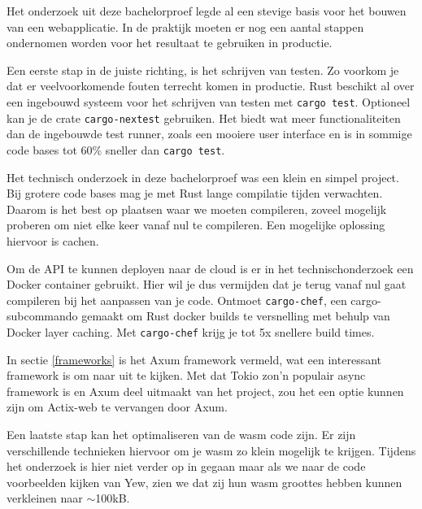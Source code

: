 Het onderzoek uit deze bachelorproef legde al een stevige basis voor het bouwen van een
webapplicatie. In de praktijk moeten er nog een aantal stappen ondernomen worden voor het resultaat
te gebruiken in productie.

Een eerste stap in de juiste richting, is het schrijven van testen. Zo voorkom je dat er
veelvoorkomende fouten terrecht komen in productie. Rust beschikt al over een ingebouwd systeem voor
het schrijven van testen met \texttt{cargo test}. Optioneel kan je de crate
\texttt{cargo-nextest} gebruiken. Het biedt wat meer functionaliteiten dan de ingebouwde
test runner, zoals een mooiere user interface en is in sommige code bases tot 60\% sneller dan
\texttt{cargo test}.

Het technisch onderzoek in deze bachelorproef was een klein en simpel project. Bij grotere code
bases mag je met Rust lange compilatie tijden verwachten. Daarom is het best op plaatsen waar we
moeten compileren, zoveel mogelijk proberen om niet elke keer vanaf nul te compileren. Een mogelijke
oplossing hiervoor is cachen.

Om de API te kunnen deployen naar de cloud is er in het technischonderzoek een Docker container
gebruikt. Hier wil je dus vermijden dat je terug vanaf nul gaat compileren bij het aanpassen van je
code. Ontmoet \texttt{cargo-chef}, een cargo-subcommando gemaakt om Rust docker builds te
versnelling met behulp van Docker layer caching. Met \texttt{cargo-chef} krijg je tot 5x
snellere build times.

In sectie \ref{frameworks} is het Axum framework vermeld, wat een interessant framework is om naar
uit te kijken. Met dat Tokio zon'n populair async framework is en Axum deel uitmaakt van het
project, zou het een optie kunnen zijn om Actix-web te vervangen door Axum. 

Een laatste stap kan het optimaliseren van de wasm code zijn. Er zijn verschillende technieken
hiervoor om je wasm zo klein mogelijk te krijgen. Tijdens het onderzoek is hier niet verder op in
gegaan maar als we naar de code voorbeelden kijken van Yew, zien we dat zij hun wasm groottes hebben
kunnen verkleinen naar $\sim$100kB. \cite{wasm_size}
